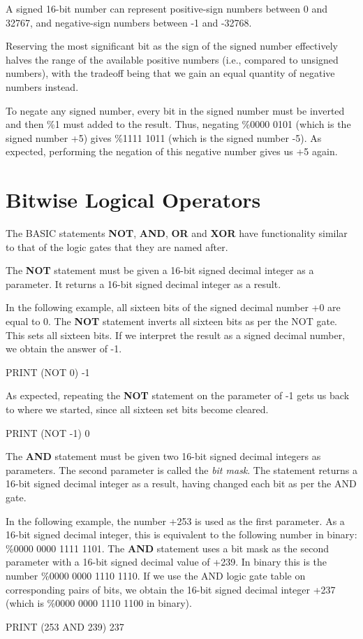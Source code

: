 A signed 16-bit number can represent positive-sign numbers between 0 and 32767, and negative-sign numbers between -1 and -32768.

Reserving the most significant bit as the sign of the signed number effectively halves the range of the available positive numbers (i.e., compared to unsigned numbers), with the tradeoff being that we gain an equal quantity of negative numbers instead.

To negate any signed number, every bit in the signed number must be inverted and then \%1 must added to the result. Thus, negating \%0000 0101 (which is the signed number +5) gives \%1111 1011 (which is the signed number -5). As expected, performing the negation of this negative number gives us +5 again.

\section{Bitwise Logical Operators}

The BASIC statements {\bf NOT}, {\bf AND}, {\bf OR} and {\bf XOR} have functionality similar to that of the logic gates that they are named after.

The {\bf NOT} statement must be given a 16-bit signed decimal integer as a parameter. It returns a 16-bit signed decimal integer as a result.

In the following example, all sixteen bits of the signed decimal number +0 are equal to 0. The {\bf NOT} statement inverts all sixteen bits as per the NOT gate. This sets all sixteen bits. If we interpret the result as a signed decimal number, we obtain the answer of -1.
\begin{screenoutput}
PRINT (NOT 0)
-1
\end{screenoutput}

As expected, repeating the {\bf NOT} statement on the parameter of -1 gets us back to where we started, since all sixteen set bits become cleared.
\begin{screenoutput}
PRINT (NOT -1)
 0
\end{screenoutput}

The {\bf AND} statement must be given two 16-bit signed decimal integers as parameters. The second parameter is called the {\it bit mask}. The statement returns a 16-bit signed decimal integer as a result, having changed each bit as per the AND gate.

In the following example, the number +253 is used as the first parameter. As a 16-bit signed decimal integer, this is equivalent to the following number in binary: \%0000 0000 1111 1101. The {\bf AND} statement uses a bit mask as the second parameter with a 16-bit signed decimal value of +239. In binary this is the number \%0000 0000 1110 1110. If we use the AND logic gate table on corresponding pairs of bits, we obtain the 16-bit signed decimal integer +237 (which is \%0000 0000 1110 1100 in binary).
\begin{screenoutput}
PRINT (253 AND 239)
 237
\end{screenoutput}

